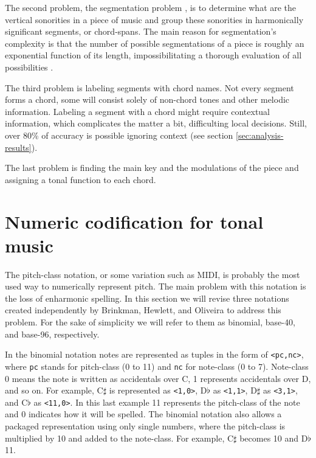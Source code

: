 \documentclass{article}
\begin{document}
The second problem, the segmentation problem
\cite{pardo.ea:automated}, is to determine what are the vertical
sonorities in a piece of music and group these sonorities in
harmonically significant segments, or chord-spans. The main reason for
segmentation's complexity is that the number of possible segmentations
of a piece is roughly an exponential function of its length,
impossibilitating a thorough evaluation of all possibilities
\cite{pardo.ea:algorithms}.

The third problem is labeling segments with chord names. Not every
segment forms a chord, some will consist solely of non-chord tones and
other melodic information. Labeling a segment with a chord might
require contextual information, which complicates the matter a bit,
difficulting local decisions. Still, over 80\% of accuracy is possible
ignoring context (see section \ref{sec:analysis-results}).

The last problem is finding the main key and the modulations of the
piece and assigning a tonal function to each chord.

\section{Numeric codification for tonal music}
\label{sec:codificacao-jamary}

The pitch-class notation, or some variation such as MIDI, is probably
the most used way to numerically represent pitch. The main problem
with this notation is the loss of enharmonic spelling. In this section
we will revise three notations created independently by Brinkman,
Hewlett, and Oliveira \cite{brinkman:binomial, hewlett:base-40,
  oliveira:busca} to address this problem. For the sake of simplicity
we will refer to them as binomial, base-40, and base-96, respectively.

In the binomial notation notes are represented as tuples in the form
of \texttt{<pc,nc>}, where \texttt{pc} stands for pitch-class (0 to
11) and \texttt{nc} for note-class (0 to 7). Note-class 0 means the
note is written as accidentals over C, 1 represents accidentals over
D, and so on. For example, C$\sharp$ is represented as \texttt{<1,0>},
D$\flat$ as \texttt{<1,1>}, D$\sharp$ as \texttt{<3,1>}, and C$\flat$
as \texttt{<11,0>}. In this last example 11 represents the pitch-class
of the note and 0 indicates how it will be spelled. The binomial
notation also allows a packaged representation using only single
numbers, where the pitch-class is multiplied by 10 and added to the
note-class. For example, C$\sharp$ becomes 10 and D$\flat$ 11.
\end{document}
